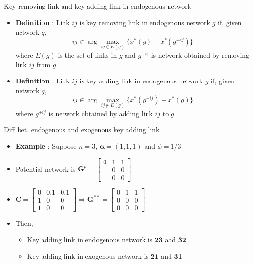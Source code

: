 \documentclass[10pt,dvipdfmx]{beamer}
\begin{document}
\begin{frame}{Key removing link and key adding link in endogenous network}
\begin{itemize}
    \item {\bf{Definition}} : Link $ij$ is key removing link in endogenous network $g$ if, given network $g$,
        \[ ij \in \arg \max_{ij \in E(g)} \{ x^*(g) - x^*(g^{-ij}) \} \]
        where $E(g)$ is the set of links in $g$ and $g^{-ij}$ is network obtained by removing link $ij$ from $g$
    \item {\bf{Definition}} : Link $ij$ is key adding link in endogenous network $g$ if, given network $g$,
        \[ ij \in \arg \max_{ij \notin E(g)} \{ x^*(g^{+ij}) - x^*(g) \} \]
        where $g^{+ij}$ is network obtained by adding link $ij$ to $g$
\end{itemize}
\end{frame}

\begin{frame}{Diff bet. endogenous and exogenous key adding link}
\begin{itemize}
    \item {\bf{Example}} : Suppose $n=3$, $\bm{\alpha} = (1,1,1)$ and $\phi = 1/3$
    \item Potential network is $\bm{G}^p = \left[
                                    \begin{array}{ccc}
                                        0 & 1 & 1 \\
                                        1 & 0 & 0 \\
                                        1 & 0 & 0
                                    \end{array} \right]$
    \item $\bm{C} = \left[
                \begin{array}{ccc}
                    0 & 0.1 & 0.1 \\
                    1 & 0 & 0 \\
                    1 & 0 & 0
                \end{array} \right] \Rightarrow
            \bm{G}^{**} = \left[
                \begin{array}{ccc}
                    0 & 1 & 1 \\
                    0 & 0 & 0 \\
                    0 & 0 & 0
                \end{array} \right]$
    \item Then,
        \begin{itemize}
            \item Key adding link in endogenous network is $\bm{23}$ and $\bm{32}$
            \item Key adding link in exogenous network is $\bm{21}$ and $\bm{31}$
        \end{itemize}
\end{itemize}
\end{frame}
\end{document}
